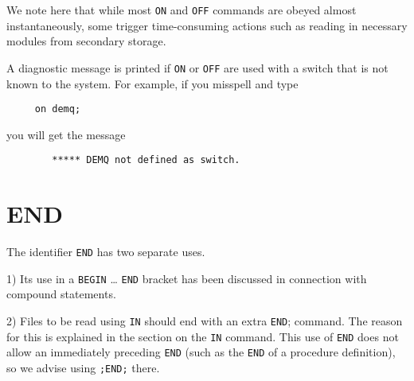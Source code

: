 We note here that while most \texttt{ON} and \texttt{OFF} commands are obeyed
almost instantaneously, some trigger time-consuming actions such as
reading in necessary modules from secondary storage.

A diagnostic message is printed if \texttt{ON} or \texttt{OFF}
 are used with a switch that is not known to the system.  For
example, if you misspell  and type
\begin{verbatim}
     on demq;
\end{verbatim}
you will get the message
\begin{verbatim}
        ***** DEMQ not defined as switch.
\end{verbatim}

\section{END}
\hypertarget{reserved:END}{}

The identifier \texttt{END} has two separate uses.

1) Its use in a \texttt{BEGIN} \ldots{} \texttt{END} bracket has been
discussed in connection with compound statements.

2) Files to be read using \texttt{IN} should end with an extra \texttt{END};
command.  The reason for this is explained in the section on the \texttt{IN}
command.  This use of \texttt{END} does not allow an immediately
preceding \texttt{END} (such as the \texttt{END} of a procedure definition), so
we advise using \texttt{;END;} there.



